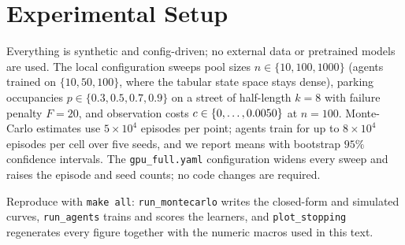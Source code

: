 \section{Experimental Setup}
Everything is synthetic and config-driven; no external data or pretrained
models are used. The local configuration sweeps pool sizes
$n\in\{10,100,1000\}$ (agents trained on $\{10,50,100\}$, where the tabular
state space stays dense), parking occupancies $p\in\{0.3,0.5,0.7,0.9\}$ on a
street of half-length $k=8$ with failure penalty $F=20$, and observation costs
$c\in\{0,\dots,0.0050\}$ at $n=100$. Monte-Carlo estimates use
$5\times10^4$ episodes per point; agents train for up to $8\times10^4$
episodes per cell over five seeds, and we report means with bootstrap $95\%$
confidence intervals. The \texttt{gpu\_full.yaml} configuration widens every
sweep and raises the episode and seed counts; no code changes are required.

Reproduce with \texttt{make all}: \texttt{run\_montecarlo} writes the
closed-form and simulated curves, \texttt{run\_agents} trains and scores the
learners, and \texttt{plot\_stopping} regenerates every figure together with
the numeric macros used in this text.

